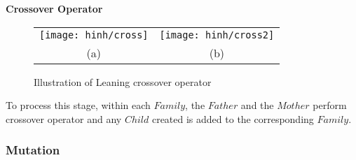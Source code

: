 \documentclass[final]{elsarticle}
\begin{document}
\begin{algorithm}[H]
	\SetAlgoLined
	\caption{\textbf{Crossover Operator}} 
	\label{alg.2}
\end{algorithm} 
\begin{figure*}[h]
	\begin{tabular}{cc}
		\texttt{[image: hinh/cross]}&\texttt{[image: hinh/cross2]}\\
		(a) & (b)\\
	\end{tabular}
	\centering
	\caption{Illustration of Leaning crossover operator
	}
	\label{Fig.5}       %
\end{figure*}

To process this stage, within each $ Family $, the $ Father $ and the $ Mother $ perform crossover operator and any $ Child $ created is added to the corresponding $ Family $.

\subsubsection{Mutation}
\end{document}
